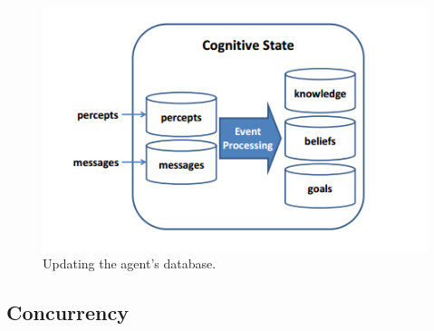 \begin{figure}[h!]
  \includegraphics[width=\linewidth]{agentstate.png}
  \caption{Updating the agent's database.}
  \label{fig:agentstate1}
\end{figure}

\subsection{Concurrency}





